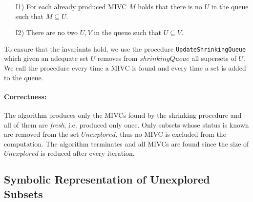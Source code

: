 \begin{itemize}
	\item[I1)] For each already produced MIVC $M$ holds that there is no $U$ in the queue such that $M \subseteq U$.
	\item[I2)] There are no two $U, V$ in the queue such that $U \subseteq V$.
\end{itemize}

To ensure that the invariants hold, we use the procedure \texttt{UpdateShrinking\-Queue} which given an adequate set $U$ removes from $\mathit{shrinkingQueue}$ all supersets of $U$. We call the procedure every time a MIVC is found and every time a set is added to the queue.

\paragraph{Correctness:}
The algorithm produces only the MIVCs found by the shrinking procedure and all of them are \emph{fresh}, i.e. produced only once. Only subsets whose status is known are removed from the set $\mathit{Unexplored}$, thus no MIVC is excluded from the computation. The algorithm terminates and all MIVCs are found since the size of $\mathit{Unexplored}$ is reduced after every iteration.
		

\subsection{Symbolic Representation of Unexplored Subsets}
\label{sec:symbolic-representation}






